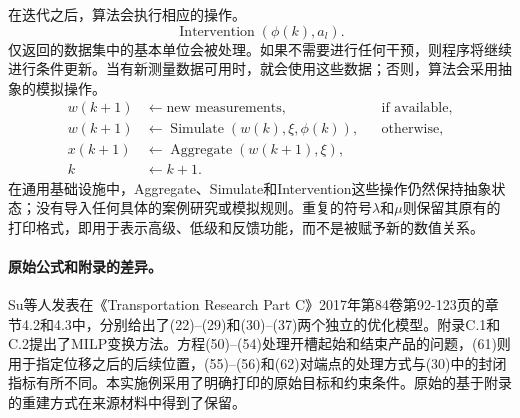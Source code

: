 \documentclass{article}
\begin{document}
在迭代之后，算法会执行相应的操作。
\[
\operatorname{Intervention}(\phi(k),a_l).
\]
仅返回的数据集中的基本单位会被处理。如果不需要进行任何干预，则程序将继续进行条件更新。当有新测量数据可用时，就会使用这些数据；否则，算法会采用抽象的模拟操作。
\[
\begin{aligned}
w(k+1)&\leftarrow\text{new measurements},&&\text{if available},\\
w(k+1)&\leftarrow\operatorname{Simulate}(w(k),\xi,\phi(k)),&&\text{otherwise},\\
x(k+1)&\leftarrow\operatorname{Aggregate}(w(k+1),\xi),\\
k&\leftarrow k+1.
\end{aligned}
\]
在通用基础设施中，Aggregate、Simulate和Intervention这些操作仍然保持抽象状态；没有导入任何具体的案例研究或模拟规则。重复的符号$\lambda$和$\mu$则保留其原有的打印格式，即用于表示高级、低级和反馈功能，而不是被赋予新的数值关系。


\paragraph{原始公式和附录的差异。}
Su等人发表在《Transportation Research Part C》2017年第84卷第92-123页的章节4.2和4.3中，分别给出了(22)--(29)和(30)--(37)两个独立的优化模型。附录C.1和C.2提出了MILP变换方法。方程(50)--(54)处理开槽起始和结束产品的问题，(61)则用于指定位移之后的后续位置，(55)--(56)和(62)对端点的处理方式与(30)中的封闭指标有所不同。本实施例采用了明确打印的原始目标和约束条件。原始的基于附录的重建方式在来源材料中得到了保留。
\end{document}
